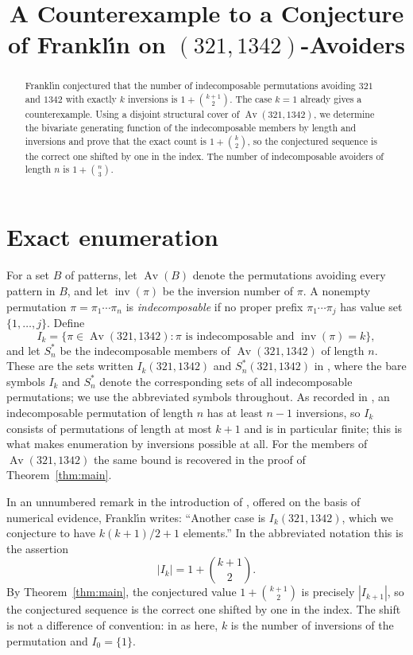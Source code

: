 \documentclass[11pt]{amsart}
\title[Frankl\'{\i}n's conjecture on $(321,1342)$-avoiders]
{A Counterexample to a Conjecture of Frankl\'{\i}n on
$(321,1342)$-Avoiders}
\date{}
\newcommand{\Av}{\operatorname{Av}}
\newcommand{\inv}{\operatorname{inv}}
\begin{document}
\begin{abstract}
Frankl\'{\i}n conjectured that the number of indecomposable permutations
avoiding $321$ and $1342$ with exactly $k$ inversions is
$1+\binom{k+1}{2}$. The case $k=1$ already gives a counterexample.
Using a disjoint structural cover of $\Av(321,1342)$, we determine the
bivariate generating function of the indecomposable members by length
and inversions and prove that the exact count is $1+\binom{k}{2}$, so
the conjectured sequence is the correct one shifted by one in the index.
The number of indecomposable avoiders of length $n$ is $1+\binom{n}{3}$.
\end{abstract}

\maketitle

\section{Exact enumeration}

For a set $B$ of patterns, let $\Av(B)$ denote the permutations avoiding
every pattern in $B$, and let $\inv(\pi)$ be the inversion number of
$\pi$. A nonempty permutation $\pi=\pi_1\cdots\pi_n$ is
\emph{indecomposable} if no proper prefix $\pi_1\cdots\pi_j$ has value
set $\{1,\ldots,j\}$. Define
\[
I_k=
\{\pi\in\Av(321,1342):
  \pi\text{ is indecomposable and }\inv(\pi)=k\},
\]
and let $S_n^*$ be the indecomposable members of $\Av(321,1342)$ of
length $n$. These are the sets written $I_k(321,1342)$ and
$S_n^*(321,1342)$ in \cite{Franklin2025}, where the bare symbols $I_k$
and $S_n^*$ denote the corresponding sets of all indecomposable
permutations; we use the abbreviated symbols throughout. As recorded in
\cite{Franklin2025}, an indecomposable permutation of length $n$ has at
least $n-1$ inversions, so $I_k$ consists of permutations of length at
most $k+1$ and is in particular finite; this is what makes enumeration
by inversions possible at all. For the members of $\Av(321,1342)$ the
same bound is recovered in the proof of Theorem~\ref{thm:main}.

In an unnumbered remark in the introduction of
\cite[p.~3]{Franklin2025}, offered on the basis of numerical evidence,
Frankl\'{\i}n writes: ``Another case is $I_k(321,1342)$, which we
conjecture to have $k(k+1)/2+1$ elements.'' In the abbreviated notation
this is the assertion
\[
|I_k|=1+\binom{k+1}{2}.
\]
By Theorem~\ref{thm:main}, the conjectured value $1+\binom{k+1}{2}$ is
precisely $|I_{k+1}|$, so the conjectured sequence is the correct one
shifted by one in the index. The shift is not a difference of
convention: in \cite{Franklin2025} as here, $k$ is the number of
inversions of the permutation and $I_0=\{1\}$.
\end{document}
